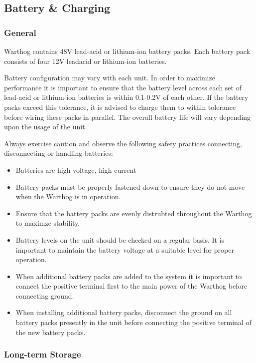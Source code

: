 \documentclass[]{clearpath-latex/clearpath-manual}
\begin{document}
\subsection{Battery \& Charging}

\subsubsection{General}

Warthog contains 48V lead-acid or lithium-ion battery packs. Each battery pack consists of four 12V leadacid or lithium-ion batteries.

Battery configuration may vary with each unit. In order to maximize performance it is important to ensure that the battery level across each set of lead-acid or lithium-ion batteries is within 0.1-0.2V of each other. If the battery packs exceed this tolerance, it is advised to charge them to within tolerance before wiring these packs
in parallel. The overall battery life will vary depending upon the usage of the unit.

Always exercise caution and observe the following safety practices connecting, disconnecting or handling batteries:

\begin{itemize}[nolistsep]
  \item Batteries are high voltage, high current
  \item Battery packs must be properly fastened down to ensure they do not move when the Warthog is in operation.
  \item Ensure that the battery packs are evenly distrubted throughout the Warthog to maximze stability.
  \item Battery levels on the unit should be checked on a regular basis.  It is important to maintain the battery voltage at a suitable level for proper operation.
  \item When additional battery packs are added to the system it is important to connect the positive terminal first to the main power of the Warthog before connecting ground.
  \item When installing additional battery packs, disconnect the ground on all battery packs presently in the unit before connecting the positive terminal of the new battery packs.
\end{itemize}

\subsubsection{Long-term Storage}
\end{document}
